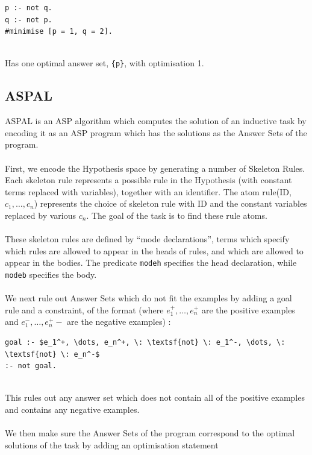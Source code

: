 \begin{lstlisting}
p :- not q.
q :- not p.
#minimise [p = 1, q = 2].
\end{lstlisting}
\mbox{}\\
Has one optimal answer set, \lstinline!{p}!, with optimisation 1.

\subsection{ASPAL}

ASPAL \cite{Corapi2012} is an ASP algorithm which computes the solution of an inductive task by encoding it as an ASP program which has the solutions as the Answer Sets of the program.\\ \\
First, we encode the Hypothesis space by generating a number of Skeleton Rules. Each skeleton rule represents a possible rule in the Hypothesis (with constant terms replaced with variables), together with an identifier. The atom rule(ID, $c_1, \dots, c_n$) represents the choice of skeleton rule with ID and the constant variables replaced by various $c_n$. The goal of the task is to find these rule atoms.\\ \\
These skeleton rules are defined by ``mode declarations'', terms which specify which rules are allowed to appear in the heads of rules, and which are allowed to appear in the bodies. The predicate \lstinline!modeh! specifies the head declaration, while \lstinline!modeb! specifies the body. \\ \\
We next rule out Answer Sets which do not fit the examples by adding a goal rule and a constraint, of the format (where $e_1^+, \dots, e_n^+$ are the positive examples and $e_1^-, \dots, e_n^+-$ are the negative examples) : \\

\begin{lstlisting}[mathescape=true]
goal :- $e_1^+, \dots, e_n^+, \: \textsf{not} \: e_1^-, \dots, \: \textsf{not} \: e_n^-$
:- not goal.
\end{lstlisting}
\mbox{}\\
This rules out any answer set which does not contain all of the positive examples and contains any negative examples. \\ \\
We then make sure the Answer Sets of the program correspond to the optimal solutions of the task by adding an optimisation statement \\

